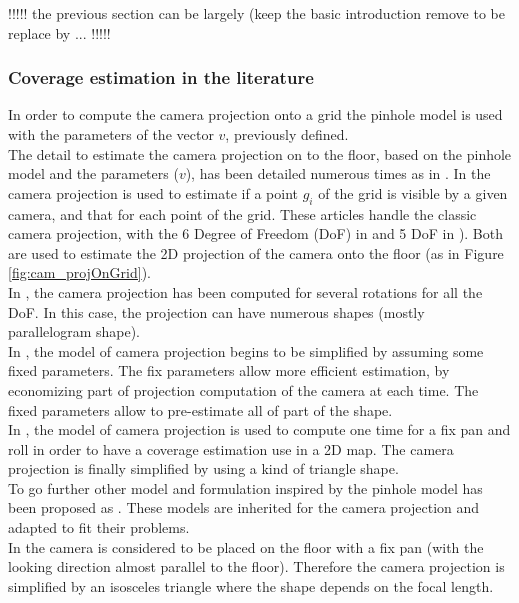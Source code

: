 !!!!! the previous section can be largely (keep the basic introduction remove to be replace by ... !!!!!
\fi
\subsubsection{Coverage estimation in the literature}

 In order to compute the camera projection onto a grid the pinhole model is used with the parameters of the vector $v$, previously defined.\\
The detail to estimate the camera projection on to the floor, based on the pinhole model and the parameters ($v$), has been detailed numerous times as in \cite{193*fu2014,181*wang2017,165*jiang2010}. In \cite{193*fu2014,181*wang2017,165*jiang2010} the camera projection is used to estimate if a point $g_i$ of the grid is visible by a given camera, and that for each point of the grid. These articles handle the classic camera projection, with  the 6 Degree of Freedom (DoF) in \citep{193*fu2014} and 5 DoF in \citep{181*wang2017}). Both are used to estimate the 2D projection of the camera onto the floor (as in Figure \ref{fig:cam_projOnGrid}). \\
In  \citep{193*fu2014}, the camera projection has been computed for several rotations for all the DoF. In this case, the projection can have numerous shapes (mostly parallelogram shape).\\
In \citep{181*wang2017}, the model of camera projection begins to be simplified by assuming some fixed parameters. The fix parameters allow more efficient estimation, by economizing part of projection computation of the camera at each time. The fixed parameters allow to pre-estimate  all of part of the shape.  \\
In \citep{165*jiang2010}, the model of camera projection is used to compute one time for a fix pan and roll in order to have a coverage estimation use in a 2D map. The camera projection is finally simplified by using a kind of triangle shape.\\
To go further other model and formulation inspired by the pinhole model has been proposed as \cite{87*morsly2012,141*akbarzadeh2013,146*li2011,194*fu2010}. These models are inherited for the camera projection and adapted to fit their problems. \\
In \cite{87*morsly2012,194*fu2010} the camera is considered to be placed on the floor with a fix pan (with the looking direction almost parallel to the floor). Therefore the camera projection is simplified by an isosceles triangle where the shape depends on the focal length.\\
